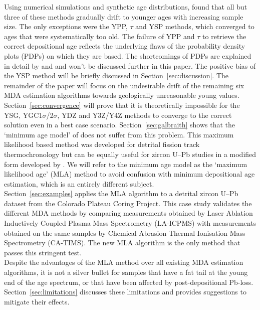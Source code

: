 \documentclass{article}
\begin{document}
Using numerical simulations and synthetic age distributions,
\citet{coutts2019} found that all but three of these methods gradually
drift to younger ages with increasing sample size.  The only
exceptions were the YPP, $\tau$ and YSP methods, which converged to
ages that were systematically too old. The failure of YPP and $\tau$
to retrieve the correct depositional age reflects the underlying flaws
of the probability density plots (PDPs) on which they are based. The
shortcomings of PDPs are explained in detail by \citet{vermeesch2012b}
and \citet{vermeesch2018b} and won't be discussed further in this
paper. The positive bias of the YSP method will be briefly discussed
in Section~\ref{sec:discussion}. The remainder of the paper will focus
on the undesirable drift of the remaining six MDA estimation
algorithms towards geologically unreasonable young values.\\

Section~\ref{sec:convergence} will prove that it is theoretically
impossible for the YSG, YGC1$\sigma$/2$\sigma$, YDZ and Y3Z/Y4Z
methods to converge to the correct solution even in a best case
scenario. Section~\ref{sec:galbraith} shows that the `minimum age
model' of \citet{galbraith1993} does not suffer from this
problem. This maximum likelihood based method was developed for
detrital fission track thermochronology but can be equally useful for
zircon U--Pb studies in a modified form developed by
\citet[][p.107]{galbraith2005}. We will refer to the minimum age model
as the `maximum likelihood age' (MLA) method to avoid confusion with
minimum depositional age estimation, which is an entirely different
subject.\\

Section~\ref{sec:examples} applies the MLA algorithm to a detrital
zircon U--Pb dataset from the Colorado Plateau Coring Project. This
case study validates the different MDA methods by comparing
measurements obtained by Laser Ablation Inductively Coupled Plasma
Mass Spectrometry (LA-ICPMS) with measurements obtained on the same
samples by Chemical Abrasion Thermal Ionisation Mass Spectrometry
(CA-TIMS). The new MLA algorithm is the only method that passes this
stringent test.\\

Despite the advantages of the MLA method over all existing MDA
estimation algorithms, it is not a silver bullet for samples that have
a fat tail at the young end of the age spectrum, or that have been
affected by post-depositional Pb-loss. Section~\ref{sec:limitations}
discusses these limitations and provides suggestions to mitigate their
effects.
\end{document}
